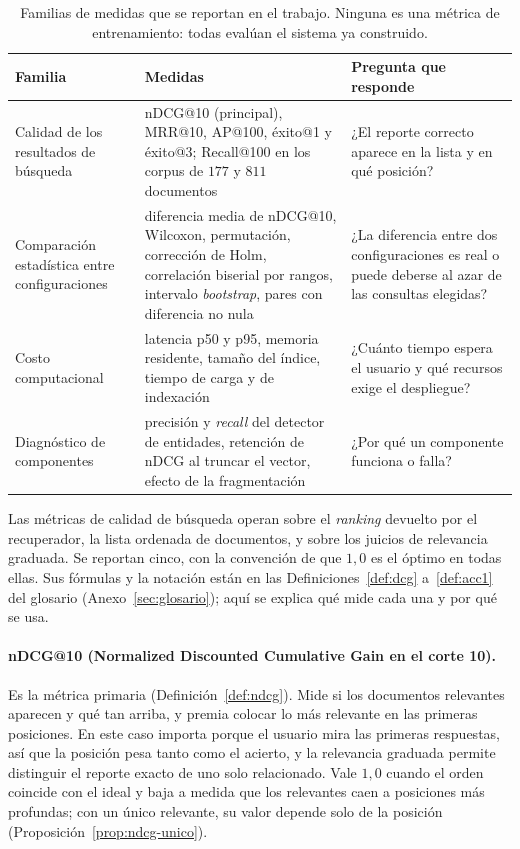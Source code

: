 \documentclass[11pt,letterpaper]{article}
\numberwithin{equation}{section}
\begin{document}
\begin{table}[htbp]
\centering
\footnotesize
\setlength{\tabcolsep}{4pt}
\renewcommand{\arraystretch}{1.3}
\caption{Familias de medidas que se reportan en el trabajo. Ninguna es una métrica de entrenamiento: todas evalúan el sistema ya construido.}
\label{tab:tipos-metricas}
\begin{tabularx}{\textwidth}{@{}>{\raggedright\arraybackslash}p{3.0cm} >{\raggedright\arraybackslash}p{4.2cm} Y@{}}
\toprule
\textbf{Familia} & \textbf{Medidas} & \textbf{Pregunta que responde} \\
\midrule
Calidad de los resultados de búsqueda & nDCG@10 (principal), MRR@10, AP@100, éxito@1 y éxito@3; Recall@100 en los corpus de $177$ y $811$ documentos & ¿El reporte correcto aparece en la lista y en qué posición? \\
Comparación estadística entre configuraciones & diferencia media de nDCG@10, Wilcoxon, permutación, corrección de Holm, correlación biserial por rangos, intervalo \textit{bootstrap}, pares con diferencia no nula & ¿La diferencia entre dos configuraciones es real o puede deberse al azar de las consultas elegidas? \\
Costo computacional & latencia p50 y p95, memoria residente, tamaño del índice, tiempo de carga y de indexación & ¿Cuánto tiempo espera el usuario y qué recursos exige el despliegue? \\
Diagnóstico de componentes & precisión y \textit{recall} del detector de entidades, retención de nDCG al truncar el vector, efecto de la fragmentación & ¿Por qué un componente funciona o falla? \\
\bottomrule
\end{tabularx}
\end{table}

Las métricas de calidad de búsqueda operan sobre el \emph{ranking} devuelto por el recuperador, la lista ordenada de documentos, y sobre los juicios de relevancia graduada. Se reportan cinco, con la convención de que $1{,}0$ es el óptimo en todas ellas. Sus fórmulas y la notación están en las Definiciones~\ref{def:dcg} a~\ref{def:acc1} del glosario (Anexo~\ref{sec:glosario}); aquí se explica qué mide cada una y por qué se usa.

\paragraph{nDCG@10 (Normalized Discounted Cumulative Gain en el corte 10).} Es la métrica primaria (Definición~\ref{def:ndcg}). Mide si los documentos relevantes aparecen y qué tan arriba, y premia colocar lo más relevante en las primeras posiciones. En este caso importa porque el usuario mira las primeras respuestas, así que la posición pesa tanto como el acierto, y la relevancia graduada permite distinguir el reporte exacto de uno solo relacionado. Vale $1{,}0$ cuando el orden coincide con el ideal y baja a medida que los relevantes caen a posiciones más profundas; con un único relevante, su valor depende solo de la posición (Proposición~\ref{prop:ndcg-unico}).
\end{document}
